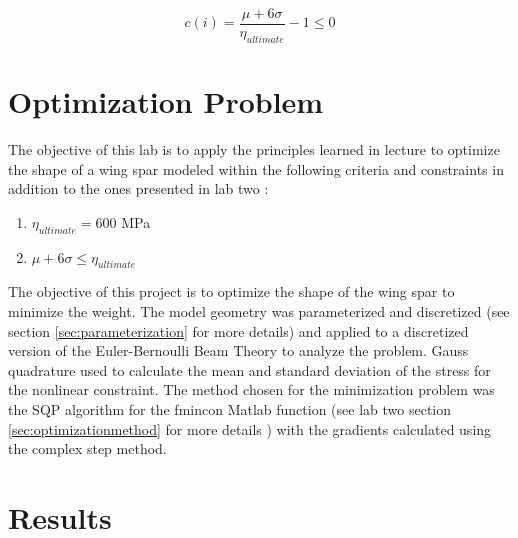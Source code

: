 \documentclass[11pt]{article}%
\begin{document}
\begin{equation}
\label{eqn:c}
c(i)=\frac{\mu+6\sigma}{\eta_{ultimate}}-1\leq0
\end{equation}

\section{Optimization Problem}
\label{sec:problem}
The objective of this lab is to apply the principles learned in lecture to optimize the shape of a wing spar modeled within the following criteria and constraints in addition to the ones presented in lab two \cite{lab2}\cite{lab4doc}\cite{lab2doc}:
\begin{enumerate}
	\item $\eta_{ultimate}=600$ MPa
	\item $\mu +6\sigma\leq \eta_{ultimate}$
\end{enumerate}
The objective of this project is to optimize the shape of the wing spar to minimize the weight. The model geometry was parameterized and discretized (see section \ref{sec:parameterization} for more details) and applied to a discretized version of the Euler-Bernoulli Beam Theory to analyze the problem. Gauss quadrature used to calculate the mean and standard deviation of the stress for the nonlinear constraint. The method chosen for the minimization problem was the SQP algorithm for the fmincon Matlab function (see lab two section \ref{sec:optimizationmethod} for more details \cite{matlab}) with the gradients calculated using the complex step method.

\section{Results}

\end{document}
